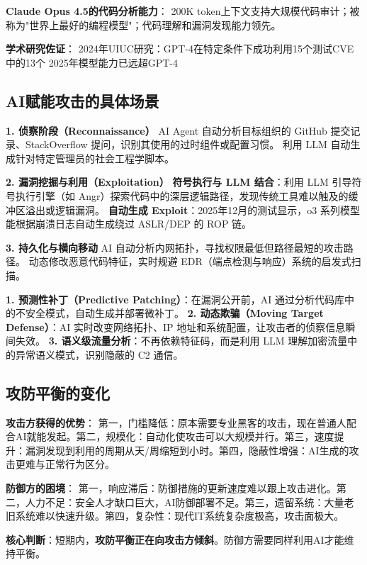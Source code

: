 \textbf{Claude Opus 4.5的代码分析能力}：
200K token上下文支持大规模代码审计；被称为"世界上最好的编程模型"；代码理解和漏洞发现能力领先。

\textbf{学术研究佐证}：
2024年UIUC研究：GPT-4在特定条件下成功利用15个测试CVE中的13个 2025年模型能力已远超GPT-4

\subsection{AI赋能攻击的具体场景}

\textbf{1. 侦察阶段（Reconnaissance）}
AI Agent 自动分析目标组织的 GitHub 提交记录、StackOverflow 提问，识别其使用的过时组件或配置习惯。 利用 LLM 自动生成针对特定管理员的社会工程学脚本。

\textbf{2. 漏洞挖掘与利用（Exploitation）}
\textbf{符号执行与 LLM 结合}：利用 LLM 引导符号执行引擎（如 Angr）探索代码中的深层逻辑路径，发现传统工具难以触及的缓冲区溢出或逻辑漏洞。 \textbf{自动生成 Exploit}：2025年12月的测试显示，o3 系列模型能根据崩溃日志自动生成绕过 ASLR/DEP 的 ROP 链。

\textbf{3. 持久化与横向移动}
AI 自动分析内网拓扑，寻找权限最低但路径最短的攻击路径。 动态修改恶意代码特征，实时规避 EDR（端点检测与响应）系统的启发式扫描。

\textbf{1. 预测性补丁（Predictive Patching）}：在漏洞公开前，AI 通过分析代码库中的不安全模式，自动生成并部署微补丁。
\textbf{2. 动态欺骗（Moving Target Defense）}：AI 实时改变网络拓扑、IP 地址和系统配置，让攻击者的侦察信息瞬间失效。
\textbf{3. 语义级流量分析}：不再依赖特征码，而是利用 LLM 理解加密流量中的异常语义模式，识别隐蔽的 C2 通信。

\subsection{攻防平衡的变化}

\textbf{攻击方获得的优势}：
第一，门槛降低：原本需要专业黑客的攻击，现在普通人配合AI就能发起。第二，规模化：自动化使攻击可以大规模并行。第三，速度提升：漏洞发现到利用的周期从天/周缩短到小时。第四，隐蔽性增强：AI生成的攻击更难与正常行为区分。

\textbf{防御方的困境}：
第一，响应滞后：防御措施的更新速度难以跟上攻击进化。第二，人力不足：安全人才缺口巨大，AI防御部署不足。第三，遗留系统：大量老旧系统难以快速升级。第四，复杂性：现代IT系统复杂度极高，攻击面极大。

\textbf{核心判断}：短期内，\textbf{攻防平衡正在向攻击方倾斜}。防御方需要同样利用AI才能维持平衡。

